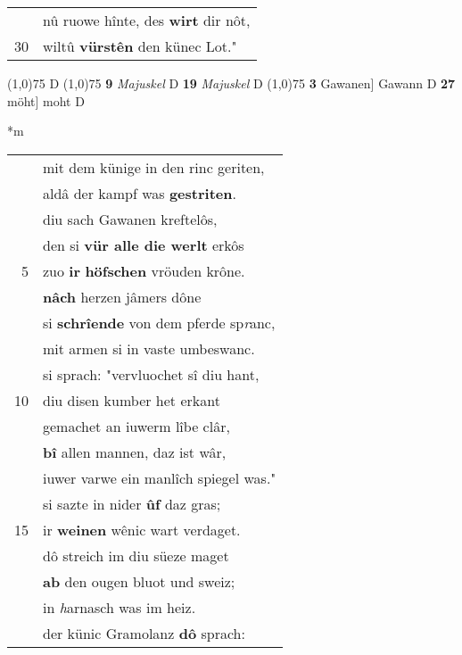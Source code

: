 \documentclass[8pt,a4paper,notitlepage]{article}
\begin{document}
\begin{table}[ht]
\begin{minipage}[t]{0.5\linewidth}
\begin{tabular}{rl}
 & nû ruowe hînte, des \textbf{wirt} dir nôt,\\ 
30 & wiltû \textbf{vürstên} den künec Lot."\\ 
\end{tabular}
\scriptsize
\line(1,0){75} \newline
D \newline
\line(1,0){75} \newline
\textbf{9} \textit{Majuskel} D  \textbf{19} \textit{Majuskel} D  \newline
\line(1,0){75} \newline
\textbf{3} Gawanen] Gawann D \textbf{27} möht] moht D \newline
\end{minipage}
\hspace{0.5cm}
\begin{minipage}[t]{0.5\linewidth}
\small
\begin{center}*m
\end{center}
\begin{tabular}{rl}
 & mit dem künige in den rinc geriten,\\ 
 & aldâ der kampf was \textbf{gestriten}.\\ 
 & diu sach Gawanen kreftelôs,\\ 
 & den si \textbf{vür alle die werlt} erkôs\\ 
5 & zuo \textbf{ir} \textbf{höfschen} vröuden krône.\\ 
 & \textbf{nâch} herzen jâmers dône\\ 
 & si \textbf{schrîende} von dem pferde sp\textit{r}anc,\\ 
 & mit armen si in vaste umbeswanc.\\ 
 & si sprach: "vervluochet sî diu hant,\\ 
10 & diu disen kumber het erkant\\ 
 & gemachet an iuwerm lîbe clâr,\\ 
 & \textbf{bî} allen mannen, daz ist wâr,\\ 
 & iuwer varwe ein manlîch spiegel was."\\ 
 & si sazte in nider \textbf{ûf} daz gras;\\ 
15 & ir \textbf{weinen} wênic wart verdaget.\\ 
 & dô streich im diu süeze maget\\ 
 & \textbf{ab} den ougen bluot und sweiz;\\ 
 & in \textit{h}arnasch was im heiz.\\ 
 & der künic Gramolanz \textbf{dô} sprach:\\ 

\end{tabular}
\end{minipage}
\end{table}
\end{document}
